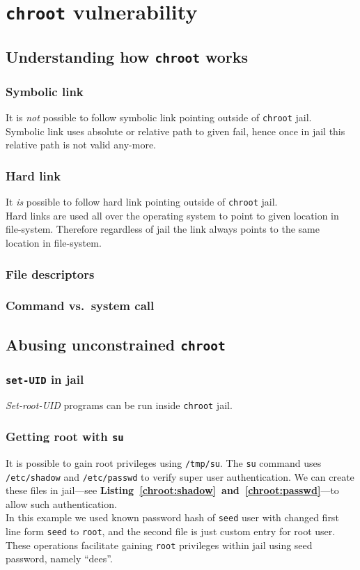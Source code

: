 \documentclass[12pt, a4paper, pdflatex]{article}
\begin{document}
\section{\texttt{chroot} vulnerability}
\subsection{Understanding how \texttt{chroot} works}
\subsubsection{Symbolic link}
It is \emph{not} possible to follow symbolic link pointing outside of \texttt{chroot} jail.\\
Symbolic link uses absolute or relative path to given fail, hence once in jail this relative path is not valid any-more.

\subsubsection{Hard link}
It \emph{is} possible to follow hard link pointing outside of \texttt{chroot} jail.\\
Hard links are used all over the operating system to point to given location in file-system. Therefore regardless of jail the link always points to the same location in file-system.

\subsubsection{File descriptors}


\subsubsection{Command vs.\ system call}

\subsection{Abusing unconstrained \texttt{chroot}}
\subsubsection{\texttt{set-UID} in jail}
\emph{Set-root-UID} programs can be run inside \texttt{chroot} jail.

\subsubsection{Getting root with \texttt{su}}
It is possible to gain root privileges using \texttt{/tmp/su}. The \texttt{su} command uses \texttt{/etc/shadow} and \texttt{/etc/passwd} to verify super user authentication. We can create these files in jail---see \textbf{Listing~\ref{chroot:shadow}~and~\ref{chroot:passwd}}---to allow such authentication.\\
In this example we used known password hash of \texttt{seed} user with changed first line form \texttt{seed} to \texttt{root}, and the second file is just custom entry for root user.\\
These operations facilitate gaining \texttt{root} privileges within jail using seed password, namely ``dees''.
\end{document}
